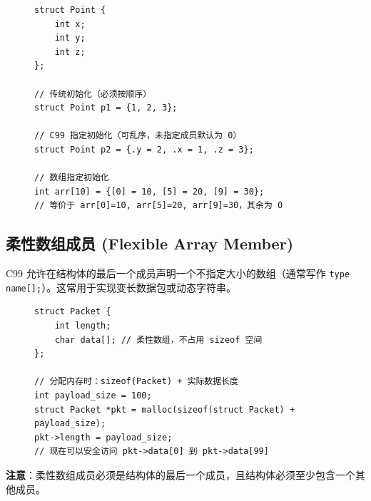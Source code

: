 \begin{figure}[H]
\centering
\begin{minipage}{0.95\textwidth}
\begin{lstlisting}[caption={指定初始化器示例}]
struct Point {
    int x;
    int y;
    int z;
};

// 传统初始化（必须按顺序）
struct Point p1 = {1, 2, 3};

// C99 指定初始化（可乱序，未指定成员默认为 0）
struct Point p2 = {.y = 2, .x = 1, .z = 3};

// 数组指定初始化
int arr[10] = {[0] = 10, [5] = 20, [9] = 30};
// 等价于 arr[0]=10, arr[5]=20, arr[9]=30，其余为 0
\end{lstlisting}
\end{minipage}
\end{figure}

\subsection{柔性数组成员 (Flexible Array Member)}

C99 允许在结构体的最后一个成员声明一个不指定大小的数组（通常写作 \texttt{type name[];}）。这常用于实现变长数据包或动态字符串。

\begin{figure}[H]
\centering
\begin{minipage}{0.95\textwidth}
\begin{lstlisting}[caption={柔性数组示例}]
struct Packet {
    int length;
    char data[]; // 柔性数组，不占用 sizeof 空间
};

// 分配内存时：sizeof(Packet) + 实际数据长度
int payload_size = 100;
struct Packet *pkt = malloc(sizeof(struct Packet) + payload_size);
pkt->length = payload_size;
// 现在可以安全访问 pkt->data[0] 到 pkt->data[99]
\end{lstlisting}
\end{minipage}
\end{figure}

\textbf{注意}：柔性数组成员必须是结构体的最后一个成员，且结构体必须至少包含一个其他成员。
